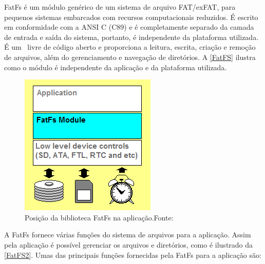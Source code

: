 FatFs é um módulo genérico de um sistema de arquivo FAT/exFAT, para pequenos sistemas embarcados com recursos computacionais reduzidos. É escrito em conformidade com a ANSI C (C89) e é completamente separado da camada de entrada e saída do sistema, portanto, é independente da plataforma utilizada. É um \software\ livre de código aberto e proporciona a leitura, escrita, criação e remoção de arquivos, além do gerenciamento e navegação de diretórios. A \autoref{FatFS} ilustra como o módulo é independente da aplicação e da plataforma utilizada.

\begin{figure}[H]
    \scriptsize
     \centering
     \includegraphics[scale=0.6]{dados/figuras/fatfs.png}
     \caption{Posição da biblioteca FatFs na aplicação.\newline  Fonte:\cite{FATFS}}
     \label{FatFS}
\end{figure}
A FatFs fornece várias funções do sistema de arquivos para a aplicação.
Assim pela aplicação é possível gerenciar os arquivos e diretórios, como é ilustrado da \autoref{FatFS2}. Umas das principais funções fornecidas pela FatFs para a aplicação são:

